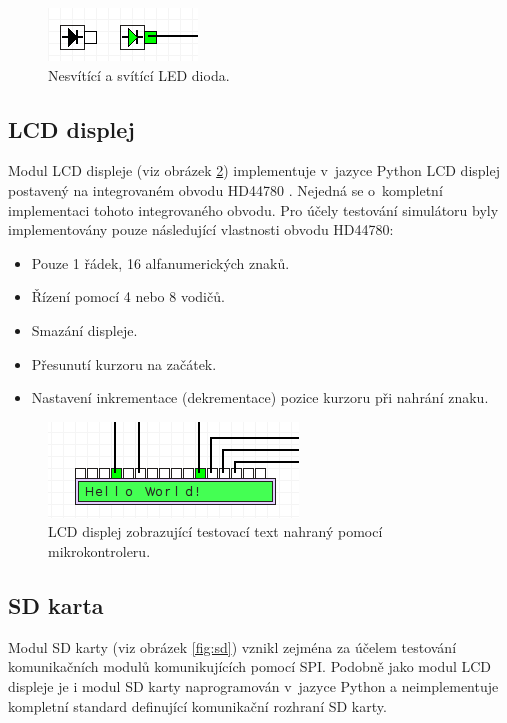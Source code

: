 \begin{figure}[ht]
\centering
\includegraphics[trim=0cm 0cm 0cm 0cm, scale=1]{fig/led}
\caption{Nesvítící a svítící LED dioda.}
\label{fig:dioda}
\end{figure}

\subsection{LCD displej}

Modul LCD displeje (viz obrázek \ref{fig:lcd}) implementuje v~jazyce Python LCD displej postavený na integrovaném obvodu HD44780 \cite{hd44780}. Nejedná se o~kompletní implementaci tohoto integrovaného obvodu. Pro účely testování simulátoru byly implementovány pouze následující vlastnosti obvodu HD44780:

\begin{itemize}
\item Pouze 1 řádek, 16 alfanumerických znaků.
\item Řízení pomocí 4 nebo 8 vodičů.
\item Smazání displeje.
\item Přesunutí kurzoru na začátek.
\item Nastavení inkrementace (dekrementace) pozice kurzoru při nahrání znaku.
\end{itemize}

\begin{figure}[ht]
\centering
\includegraphics[trim=0cm 0cm 0cm 0cm, scale=1]{fig/lcd}
\caption{LCD displej zobrazující testovací text nahraný pomocí mikrokontroleru.}
\label{fig:lcd}
\end{figure}

\subsection{SD karta}

Modul SD karty (viz obrázek \ref{fig:sd}) vznikl zejména za účelem testování komunikačních modulů komunikujících pomocí SPI. Podobně jako modul LCD displeje je i modul SD karty naprogramován v~jazyce Python a neimplementuje kompletní standard \cite{sdio} definující komunikační rozhraní SD karty.

